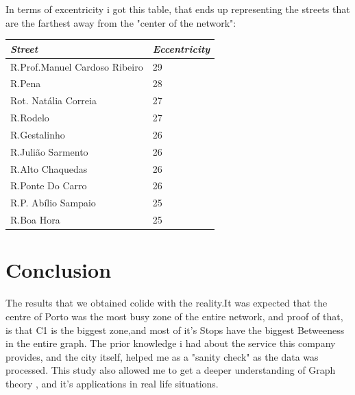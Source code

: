 \documentclass[12pt]{article}
\begin{document}
\begin{multicols}{2}
\begin{center}
\begin{tabular}[h]{|l|r|}
\hline
\end{tabular}
\end{center}

In terms of excentricity i got this table, that ends up representing the streets that are the farthest away from the "center of the network":
\begin{center}
\begin{tabular}[h]{|l|l|}
\hline
\em{Street}	& \em{Eccentricity}\\
\hline
R.Prof.Manuel Cardoso Ribeiro & 29\\
R.Pena & 28\\
Rot. Natália Correia & 27\\
R.Rodelo & 27\\
R.Gestalinho & 26\\
R.Julião Sarmento &	26\\
R.Alto Chaquedas & 26\\
R.Ponte Do Carro & 26\\
R.P. Abílio Sampaio & 25\\
R.Boa Hora & 25\\
\hline
\end{tabular}
\end{center}



\section{Conclusion}
	The results that we obtained colide with the reality.It was expected that the centre of Porto was the most busy zone of the entire network, and proof of that, is that C1 is the biggest zone,and most of it's Stops have the biggest Betweeness in the entire graph. The prior knowledge i had about the service this company provides, and the city itself, helped me as a "sanity check" as the data was processed. This study also allowed me to get a deeper understanding of Graph theory , and it's applications in real life situations.

\end{multicols}	
\end{document}
